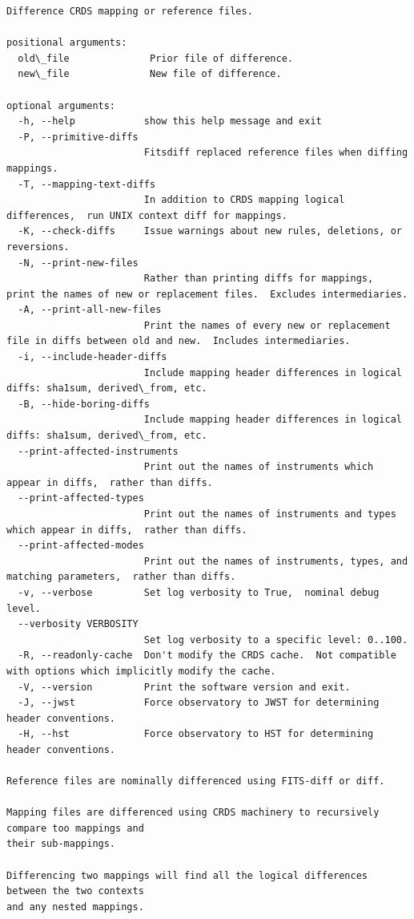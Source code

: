 \documentclass[letterpaper,10pt,english]{sphinxmanual}
\begin{document}
\begin{Verbatim}[commandchars=\\\{\}]
Difference CRDS mapping or reference files.

positional arguments:
  old\_file              Prior file of difference.
  new\_file              New file of difference.

optional arguments:
  -h, --help            show this help message and exit
  -P, --primitive-diffs
                        Fitsdiff replaced reference files when diffing mappings.
  -T, --mapping-text-diffs
                        In addition to CRDS mapping logical differences,  run UNIX context diff for mappings.
  -K, --check-diffs     Issue warnings about new rules, deletions, or reversions.
  -N, --print-new-files
                        Rather than printing diffs for mappings,  print the names of new or replacement files.  Excludes intermediaries.
  -A, --print-all-new-files
                        Print the names of every new or replacement file in diffs between old and new.  Includes intermediaries.
  -i, --include-header-diffs
                        Include mapping header differences in logical diffs: sha1sum, derived\_from, etc.
  -B, --hide-boring-diffs
                        Include mapping header differences in logical diffs: sha1sum, derived\_from, etc.
  --print-affected-instruments
                        Print out the names of instruments which appear in diffs,  rather than diffs.
  --print-affected-types
                        Print out the names of instruments and types which appear in diffs,  rather than diffs.
  --print-affected-modes
                        Print out the names of instruments, types, and matching parameters,  rather than diffs.
  -v, --verbose         Set log verbosity to True,  nominal debug level.
  --verbosity VERBOSITY
                        Set log verbosity to a specific level: 0..100.
  -R, --readonly-cache  Don't modify the CRDS cache.  Not compatible with options which implicitly modify the cache.
  -V, --version         Print the software version and exit.
  -J, --jwst            Force observatory to JWST for determining header conventions.
  -H, --hst             Force observatory to HST for determining header conventions.

Reference files are nominally differenced using FITS-diff or diff.

Mapping files are differenced using CRDS machinery to recursively compare too mappings and
their sub-mappings.

Differencing two mappings will find all the logical differences between the two contexts
and any nested mappings.


\end{Verbatim}
\end{document}
